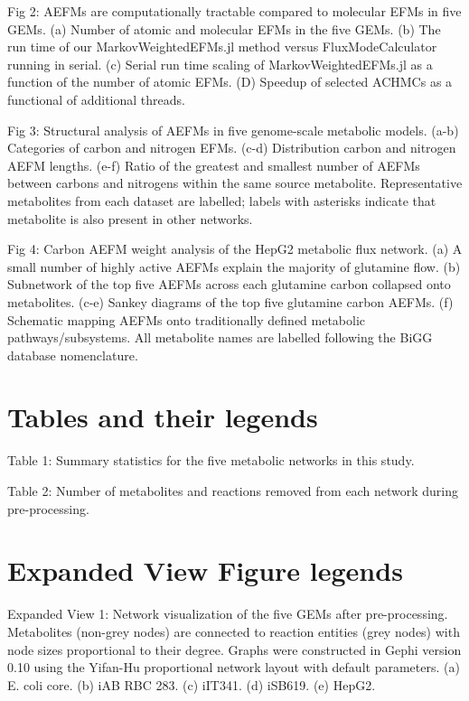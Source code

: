\documentclass[12pt]{article}
\begin{document}
\noindent Fig 2: AEFMs are computationally tractable compared to
molecular EFMs in five GEMs. (a) Number of atomic and molecular EFMs in
the five GEMs. (b) The run time of our MarkovWeightedEFMs.jl method versus
FluxModeCalculator running in serial. (c) Serial run time scaling of
MarkovWeightedEFMs.jl as a function of the number of atomic EFMs. (D)
Speedup of selected ACHMCs as a functional of additional threads.

\noindent Fig 3: Structural analysis of AEFMs in five genome-scale
metabolic models. (a-b) Categories of carbon and nitrogen EFMs. (c-d)
Distribution carbon and nitrogen AEFM lengths. (e-f) Ratio of the greatest
and smallest number of AEFMs between carbons and nitrogens within the same
source metabolite. Representative metabolites from each dataset are
labelled; labels with asterisks indicate that metabolite is also present
in other networks.

\noindent Fig 4: Carbon AEFM weight analysis of the HepG2 metabolic
flux network. (a) A small number of highly active AEFMs explain the
majority of glutamine flow. (b) Subnetwork of the top five AEFMs across
each glutamine carbon collapsed onto metabolites. (c-e) Sankey diagrams of
the top five glutamine carbon AEFMs. (f) Schematic mapping AEFMs onto
traditionally defined metabolic pathways/subsystems. All metabolite names are
labelled following the BiGG database nomenclature.

\section*{Tables and their legends}

\noindent Table 1: Summary statistics for the five metabolic networks in
this study.

\noindent Table 2: Number of metabolites and reactions removed from each
network during pre-processing.

\section*{Expanded View Figure legends}

\noindent Expanded View 1: Network visualization of the five GEMs after
pre-processing. Metabolites (non-grey nodes) are connected to reaction
entities (grey nodes) with node sizes proportional to their degree. Graphs
were constructed in Gephi version 0.10 using the Yifan-Hu proportional
network layout with default parameters. (a) E. coli core. (b) iAB RBC 283.
(c) iIT341. (d) iSB619. (e) HepG2.
\end{document}
